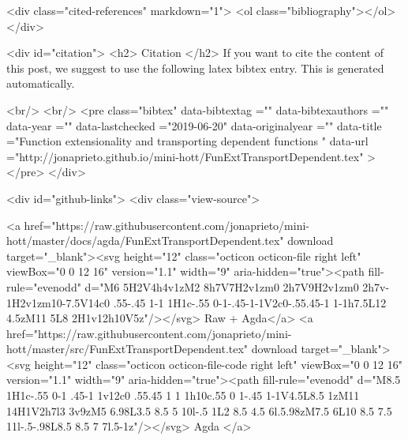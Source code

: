   <div class="cited-references" markdown="1">
  <ol class="bibliography"></ol>
  </div>


  
  <div id="citation">
  <h2> Citation </h2>
  If you want to cite the content of this post,
  we suggest to use the following latex bibtex entry.
  This is generated automatically.

  <br/>
  <br/>
  <pre class="bibtex"
       data-bibtextag =""
       data-bibtexauthors =""
       data-year =""
       data-lastchecked ="2019-06-20"
       data-originalyear =""
       data-title ="Function extensionality and transporting dependent functions "
       data-url ="http://jonaprieto.github.io/mini-hott/FunExtTransportDependent.tex"
  ></pre>
  </div>
  

  <div id="github-links">
    <div class="view-source">
      
        <a href="https://raw.githubusercontent.com/jonaprieto/mini-hott/master/docs/agda/FunExtTransportDependent.tex" download target="_blank"><svg height="12" class="octicon octicon-file right left" viewBox="0 0 12 16" version="1.1" width="9" aria-hidden="true"><path fill-rule="evenodd" d="M6 5H2V4h4v1zM2 8h7V7H2v1zm0 2h7V9H2v1zm0 2h7v-1H2v1zm10-7.5V14c0 .55-.45 1-1 1H1c-.55 0-1-.45-1-1V2c0-.55.45-1 1-1h7.5L12 4.5zM11 5L8 2H1v12h10V5z"/></svg> Raw + Agda</a>
        <a href="https://raw.githubusercontent.com/jonaprieto/mini-hott/master/src/FunExtTransportDependent.tex" download target="_blank"><svg height="12" class="octicon octicon-file-code right left" viewBox="0 0 12 16" version="1.1" width="9" aria-hidden="true"><path fill-rule="evenodd" d="M8.5 1H1c-.55 0-1 .45-1 1v12c0 .55.45 1 1 1h10c.55 0 1-.45 1-1V4.5L8.5 1zM11 14H1V2h7l3 3v9zM5 6.98L3.5 8.5 5 10l-.5 1L2 8.5 4.5 6l.5.98zM7.5 6L10 8.5 7.5 11l-.5-.98L8.5 8.5 7 7l.5-1z"/></svg> Agda </a>
      
